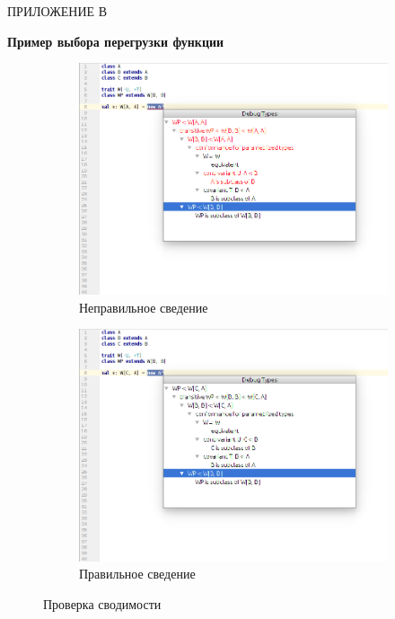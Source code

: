 \vfill
\clearpage
\newpage


\vfill
\clearpage
\appendix

\hfill ПРИЛОЖЕНИЕ В
\begin{center}
  \textbf{Пример выбора перегрузки функции}
\end{center}
\markboth{\MakeUppercase{}}{}

\begin{figure}[h!]
  \centering
  \begin{subfigure}{\linewidth}
    \centering
    \includegraphics[width=.8\linewidth]{img/conformance1}
    \caption{Неправильное сведение}
  \end{subfigure}

  \begin{subfigure}{\linewidth}
    \centering
    \includegraphics[width=.8\linewidth]{img/conformance2}
    \caption{Правильное сведение}
  \end{subfigure}
  \caption{Проверка сводимости}
  \label{fig:overloading}
\end{figure}
